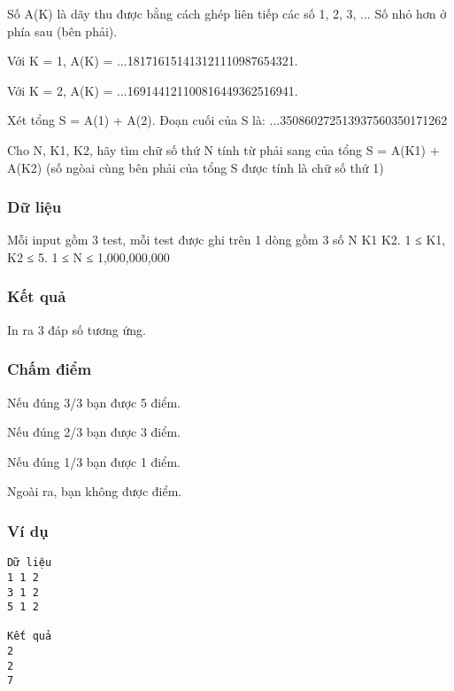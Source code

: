 

Số A(K) là dãy thu được bằng cách ghép liên tiếp các số 1\textasciicircumK, 2\textasciicircumK, 3\textasciicircumK, ... Số nhỏ hơn ở phía sau (bên phải).

Với K = 1, A(K) = ...181716151413121110987654321.

Với K = 2, A(K) = ...169144121100816449362516941.

Xét tổng S = A(1) + A(2). Đoạn cuối của S là: ...350860272513937560350171262

Cho N, K1, K2, hãy tìm chữ số thứ N tính từ phải sang của tổng S = A(K1) + A(K2) (số ngòai cùng bên phải của tổng S được tính là chữ số thứ 1)

\subsubsection{Dữ liệu}

Mỗi input gồm 3 test, mỗi test được ghi trên 1 dòng gồm 3 số N K1 K2. 1 ≤ K1, K2 ≤ 5. 1 ≤ N ≤ 1,000,000,000

\subsubsection{Kết quả}

In ra 3 đáp số tương ứng.

\subsubsection{Chấm điểm}

Nếu đúng 3/3 bạn được 5 điểm.

Nếu đúng 2/3 bạn được 3 điểm.

Nếu đúng 1/3 bạn được 1 điểm.

Ngoài ra, bạn không được điểm.

\subsubsection{Ví dụ}
\begin{verbatim}
Dữ liệu
1 1 2
3 1 2
5 1 2

Kết quả
2
2
7
\end{verbatim}